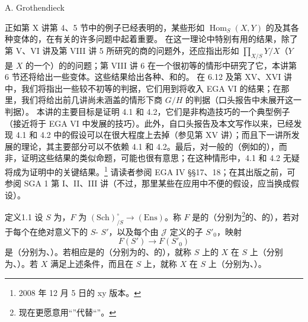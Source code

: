 \begin{center}A. Grothendieck\end{center}
正如第 X 讲第 4、5 节中的例子已经表明的，某些形如 $\operatorname{Hom}_S(X,Y)$ 的及其各种变体的，在有关的许多问题中起着重要。
在这一理论中特别有用的结果，除了第 V、VI 讲及第 VIII 讲 5 所研究的商的问题外，还应指出形如 $\prod_{X/S}Y/X$（$Y$ 是 $X$ 的一个）的的问题；第 VIII 讲 6 在一个很初等的情形中研究了它，本讲第 6 节还将给出一些变体。这些结果给出各种、和的。
在 6.12 及第 XV、XVI 讲中，我们将指出一些较不初等的判据，它们用到将收入 EGA VI 的结果；在那里，我们将给出前几讲尚未涵盖的情形下商 $G/H$ 的判据（口头报告中未展开这一判据）。
本讲的主要目标是证明 4.1 和 4.2，它们是非构造技巧的一个典型例子（接近将于 EGA VI 中发展的技巧）。此外，自口头报告及本文写作以来，已经发现 4.1 和 4.2 中的假设可以在很大程度上去掉（参见第 XV 讲）；而且下一讲所发展的理论，其主要部分可以不依赖 4.1 和 4.2。最后，对一般的（例如的），而非，证明这些结果的类似命题，可能也很有意思；在这种情形中，4.1 和 4.2 无疑将成为证明中的关键结果。\footnote[0]{2008 年 12 月 5 日的 xy 版本。}
请读者参阅 EGA IV §§17、18；在其出版之前，可参阅 SGA 1 第 I、II、III 讲（不过，那里某些在应用中不便的假设，应当换成假设）。
\begin{SGAresult}{定义}{1.1}
设 $S$ 为，$F$ 为 $(\mathrm{Sch})^{\circ}_{/S}\to(\mathrm{Ens})$。称 $F$ 是的（分别为\begingroup\renewcommand{\thefootnote}{\ensuremath{*}}\footnote{现在更愿意用“”代替“”。}\endgroup{}的、的），若对于每个在绝对意义下的 $S$- $S'$，以及每个由 $\mathscr J$ 定义的子 $S'_0$，映射
\[F(S')\longrightarrow F(S'_0)\]
是（分别为、）。若相应是的（分别为的、的），就称 $S$ 上的 $X$ 在 $S$ 上（分别为、）。若 $X$ 满足上述条件，而且在 $S$ 上，就称 $X$ 在 $S$ 上（分别为、）。
\end{SGAresult}
